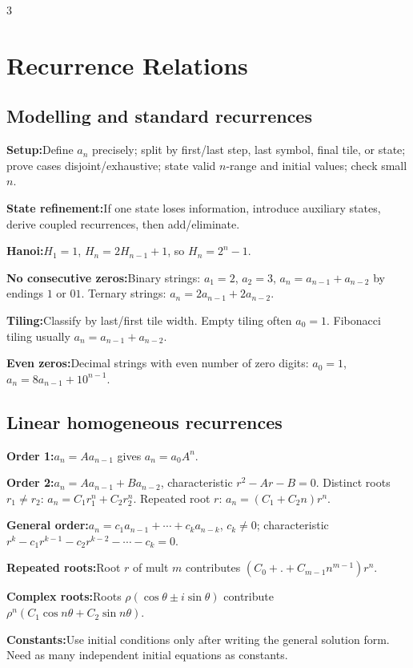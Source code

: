 \documentclass[10pt]{article}
\newenvironment{cheatitems}{\par\vspace{-1pt}}{\par\vspace{-1pt}}
\newcommand{\cheatrow}[2]{\par\noindent\textbf{#1:}\enspace #2\par}
\begin{document}
\begin{multicols}{3}
\section*{Recurrence Relations}
\subsection*{Modelling and standard recurrences}
\begin{cheatitems}
\cheatrow{Setup}{Define $a_n$ precisely; split by first/last step, last symbol, final tile, or state; prove cases disjoint/exhaustive; state valid $n$-range and initial values; check small $n$.}
\cheatrow{State refinement}{If one state loses information, introduce auxiliary states, derive coupled recurrences, then add/eliminate.}
\cheatrow{Hanoi}{$H_1=1$, $H_n=2H_{n-1}+1$, so $H_n=2^n-1$.}
\cheatrow{No consecutive zeros}{Binary strings: $a_1=2$, $a_2=3$, $a_n=a_{n-1}+a_{n-2}$ by endings $1$ or $01$. Ternary strings: $a_n=2a_{n-1}+2a_{n-2}$.}
\cheatrow{Tiling}{Classify by last/first tile width. Empty tiling often $a_0=1$. Fibonacci tiling usually $a_n=a_{n-1}+a_{n-2}$.}
\cheatrow{Even zeros}{Decimal strings with even number of zero digits: $a_0=1$, $a_n=8a_{n-1}+10^{n-1}$.}
\end{cheatitems}

\subsection*{Linear homogeneous recurrences}
\begin{cheatitems}
\cheatrow{Order 1}{$a_n=Aa_{n-1}$ gives $a_n=a_0A^n$.}
\cheatrow{Order 2}{$a_n=Aa_{n-1}+Ba_{n-2}$, characteristic $r^2-Ar-B=0$. Distinct roots $r_1\ne r_2$: $a_n=C_1r_1^n+C_2r_2^n$. Repeated root $r$: $a_n=(C_1+C_2n)r^n$.}
\cheatrow{General order}{$a_n=c_1a_{n-1}+\cdots+c_ka_{n-k}$, $c_k\ne0$; characteristic $r^k-c_1r^{k-1}-c_2r^{k-2}-\cdots-c_k=0$.}
\cheatrow{Repeated roots}{Root $r$ of mult $m$ contributes $(C_0\!+.+\!C_{m-1}n^{m-1})r^n$.}
\cheatrow{Complex roots}{Roots $\rho(\cos\theta\pm i\sin\theta)$ contribute $\rho^n(C_1\cos n\theta+C_2\sin n\theta)$.}
\cheatrow{Constants}{Use initial conditions only after writing the general solution form. Need as many independent initial equations as constants.}
\end{cheatitems}


\end{multicols}
\end{document}
